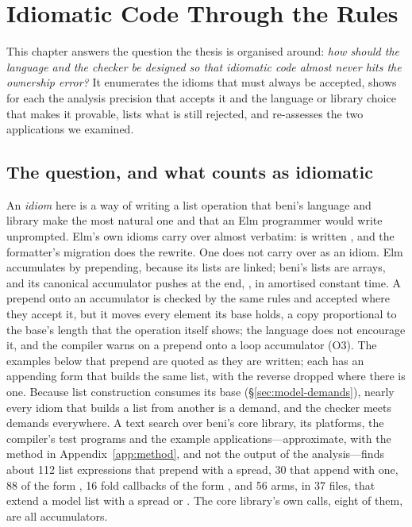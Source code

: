 \chapter{Idiomatic Code Through the Rules}
\label{sec:idioms}

This chapter answers the question the thesis is organised around: \emph{how should the language and
the checker be designed so that idiomatic code almost never hits the ownership error?} It enumerates
the idioms that must always be accepted, shows for each the analysis precision that accepts it and the
language or library choice that makes it provable, lists what is still rejected, and re-assesses the
two applications we examined.

\section{The question, and what counts as idiomatic}
\label{sec:idioms-question}

An \emph{idiom} here is a way of writing a list operation that beni's language and library make the most
natural one and that an Elm programmer would write unprompted. Elm's own idioms carry over almost
verbatim:  is written \code{[ x, …acc ]}, and the formatter's migration does the rewrite.
One does not carry over as an idiom. Elm accumulates by prepending, because its lists are linked; beni's
lists are arrays, and its canonical accumulator pushes at the end, \code{[ …acc, x ]}, in amortised
constant time. A prepend onto an accumulator is checked by the same rules and accepted where they accept
it, but it moves every element its base holds, a copy proportional to the base's length that the
operation itself shows; the language does not encourage it, and the compiler warns on a prepend onto a loop accumulator (O3). The examples below that prepend are
quoted as they are written; each has an appending form that builds the same list, with the reverse
dropped where there is one. Because list construction consumes its base (\S\ref{sec:model-demands}), nearly every idiom that builds
a list from another is a demand, and the checker meets demands everywhere. A text search over beni's
core library, its platforms, the compiler's test programs and the example applications---approximate,
with the method in Appendix~\ref{app:method}, and not the output of the analysis---finds about 112 list
expressions that prepend with a spread, 30 that append with one, 88 of the form , 16
fold callbacks of the form , and 56  arms, in 37 files, that
extend a model list with a spread or \code{++}. The core library's own  calls, eight of
them, are all accumulators.

